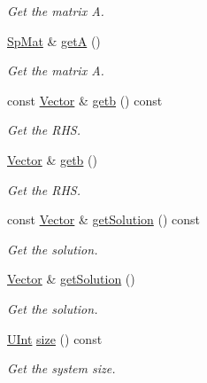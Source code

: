 \begin{DoxyCompactItemize}
\begin{DoxyCompactList}\small\item\em Get the matrix A. \end{DoxyCompactList}\item 
\hyperlink{namespaceFVCode3D_ac1032289d96638cf0ad6c52ef639095f}{Sp\+Mat} \& \hyperlink{classFVCode3D_1_1Solver_a14ff22ed6eeb9e834f401bad1a3151f3}{getA} ()
\begin{DoxyCompactList}\small\item\em Get the matrix A. \end{DoxyCompactList}\item 
const \hyperlink{namespaceFVCode3D_a16ccf345652402bccd1a5d2e6782526c}{Vector} \& \hyperlink{classFVCode3D_1_1Solver_a0621b7fdae5f30da9ee9c3bc0401ab17}{getb} () const 
\begin{DoxyCompactList}\small\item\em Get the R\+HS. \end{DoxyCompactList}\item 
\hyperlink{namespaceFVCode3D_a16ccf345652402bccd1a5d2e6782526c}{Vector} \& \hyperlink{classFVCode3D_1_1Solver_a2caeb5ed29448a9b607b11834b8fe5ae}{getb} ()
\begin{DoxyCompactList}\small\item\em Get the R\+HS. \end{DoxyCompactList}\item 
const \hyperlink{namespaceFVCode3D_a16ccf345652402bccd1a5d2e6782526c}{Vector} \& \hyperlink{classFVCode3D_1_1Solver_a461d049e52ffc237cce3447c82860d3c}{get\+Solution} () const 
\begin{DoxyCompactList}\small\item\em Get the solution. \end{DoxyCompactList}\item 
\hyperlink{namespaceFVCode3D_a16ccf345652402bccd1a5d2e6782526c}{Vector} \& \hyperlink{classFVCode3D_1_1Solver_a321644e783c7bc457458ad26431122bd}{get\+Solution} ()
\begin{DoxyCompactList}\small\item\em Get the solution. \end{DoxyCompactList}\item 
\hyperlink{namespaceFVCode3D_a4bf7e328c75d0fd504050d040ebe9eda}{U\+Int} \hyperlink{classFVCode3D_1_1Solver_abb77eef6a84472f2452e9e0ffe637626}{size} () const 
\begin{DoxyCompactList}\small\item\em Get the system size. \end{DoxyCompactList}\item 

\end{DoxyCompactItemize}
